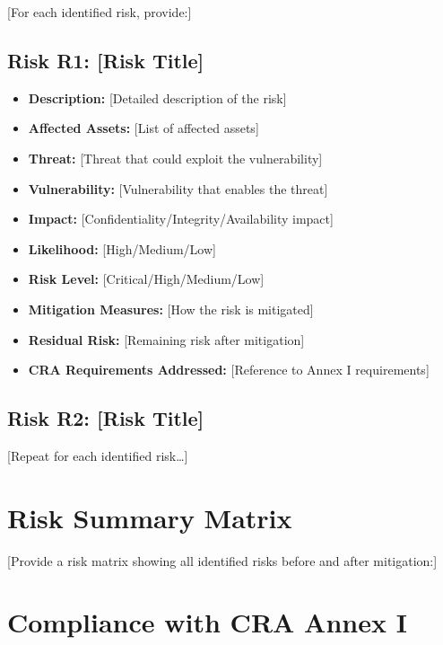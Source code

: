 \documentclass[
  11 pt,
  a4paper,
  table]{report}
\providecommand{\tightlist}{%
  \setlength{\itemsep}{0pt}\setlength{\parskip}{0pt}}\usepackage{longtable,booktabs,array}
\begin{document}
{[}For each identified risk, provide:{]}

\subsection{Risk R1: {[}Risk Title{]}}\label{risk-r1-risk-title}

\begin{itemize}
\tightlist
\item
  \textbf{Description:} {[}Detailed description of the risk{]}
\item
  \textbf{Affected Assets:} {[}List of affected assets{]}
\item
  \textbf{Threat:} {[}Threat that could exploit the vulnerability{]}
\item
  \textbf{Vulnerability:} {[}Vulnerability that enables the threat{]}
\item
  \textbf{Impact:} {[}Confidentiality/Integrity/Availability impact{]}
\item
  \textbf{Likelihood:} {[}High/Medium/Low{]}
\item
  \textbf{Risk Level:} {[}Critical/High/Medium/Low{]}
\item
  \textbf{Mitigation Measures:} {[}How the risk is mitigated{]}
\item
  \textbf{Residual Risk:} {[}Remaining risk after mitigation{]}
\item
  \textbf{CRA Requirements Addressed:} {[}Reference to Annex I
  requirements{]}
\end{itemize}

\subsection{Risk R2: {[}Risk Title{]}}\label{risk-r2-risk-title}

{[}Repeat for each identified risk\ldots{]}

\section{Risk Summary Matrix}\label{risk-summary-matrix}

{[}Provide a risk matrix showing all identified risks before and after
mitigation:{]}

\section{Compliance with CRA Annex I}\label{compliance-with-cra-annex-i}
\end{document}
